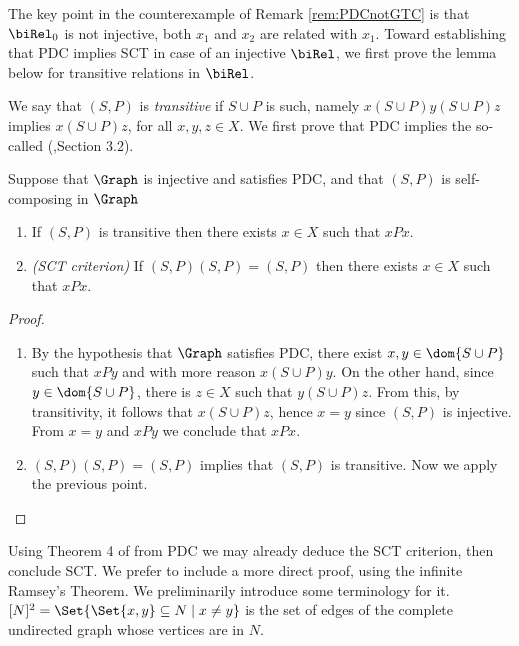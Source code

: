 The key point in the counterexample of Remark \ref{rem:PDCnotGTC} is that $\biRel_0$ is not injective, both $x_1$ and $x_2$ are related with $x_1$. 
Toward establishing that PDC implies SCT
in case of an injective $\biRel$, we first prove the lemma below for transitive relations in 
$\biRel$. 

We say that $(S,P)$ is {\em transitive} if $S \cup P$ is such, namely $x(S \cup P)y(S \cup P)z$ implies $x(S \cup P) z$, for all $x, y, z \in X$. We first prove that PDC implies the so-called
 (\cite{Lee1},Section 3.2).

\begin{lemma}
\label{lem:transitivity}
Suppose that $\Graph$ is injective and satisfies PDC, and that 
$(S,P)$ is self-composing in $\Graph$ 
\begin{enumerate}
\item
\label{lem:transitivity-01}
If $(S,P)$ is transitive then there exists $x \in X$ such that $xPx$.

\item
\label{lem:transitivity-02}
\emph{(SCT criterion)} If $(S,P)(S,P)=(S,P)$ then there exists $x \in X$ such that $xPx$.
\end{enumerate}
\end{lemma}

\begin{proof}
\begin{enumerate}
\item
By the hypothesis that $\Graph$ satisfies PDC, there exist $x,y \in \dom{S \cup P}$ such that $xPy$ and with more reason $x(S \cup P)y$. On the other hand, since $y \in \dom{S \cup P}$, there is $z \in X$ such that $y(S \cup P)z$. From this, by transitivity, it follows that
$x(S \cup P)z$, hence $x = y$ since $(S,P)$ is injective. From $x=y$ and $xPy$ we conclude
that $xPx$.
\item
$(S,P)(S,P)=(S,P)$ implies that $(S,P)$ is transitive. Now we apply the previous point.
\end{enumerate}
\end{proof}

Using Theorem 4 of \cite{Lee1} from PDC we may already deduce the SCT criterion,
then conclude SCT. We prefer to include a 
more direct proof, %
using the infinite Ramsey's Theorem. We preliminarily introduce some terminology for it. 
$[N]^2 = \Set{\Set{x,y} \subseteq N \mid x \neq y}$ is the set of edges of the complete undirected graph whose vertices are in $N$. 


